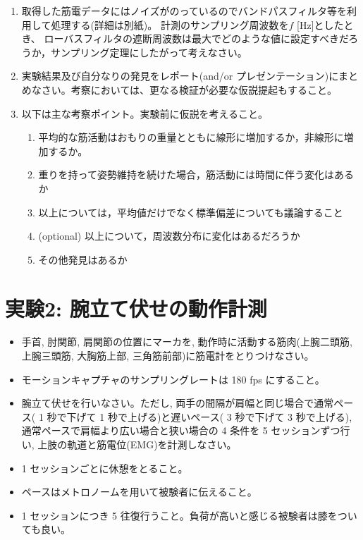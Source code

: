 \documentclass{jsarticle}
\begin{document}
\begin{enumerate}
  \item 取得した筋電データにはノイズがのっているのでバンドパスフィルタ等を利用して処理する(詳細は別紙)。
  計測のサンプリング周波数を$f$ [Hz]としたとき、
  ローバスフィルタの遮断周波数は最大でどのような値に設定すべきだろうか，サンプリング定理にしたがって考えなさい。
  \item 実験結果及び自分なりの発見をレポート(and/or プレゼンテーション)にまとめなさい。考察においては、更なる検証が必要な仮説提起もすること。
  \item 以下は主な考察ポイント。実験前に仮説を考えること。
  \begin{enumerate}
    \item 平均的な筋活動はおもりの重量とともに線形に増加するか，非線形に増加するか。
    \item 重りを持って姿勢維持を続けた場合，筋活動には時間に伴う変化はあるか
    \item 以上については，平均値だけでなく標準偏差についても議論すること
    \item (optional) 以上について，周波数分布に変化はあるだろうか
    \item その他発見はあるか
  \end{enumerate}
  
\end{enumerate}


\section{実験2: 腕立て伏せの動作計測}


\begin{itemize}
\item 手首, 肘関節, 肩関節の位置にマーカを, 動作時に活動する筋肉(上腕二頭筋, 上腕三頭筋, 大胸筋上部, 三角筋前部)に筋電計をとりつけなさい。
\item モーションキャプチャのサンプリングレートは 180 fps にすること。
\item 腕立て伏せを行いなさい。ただし, 両手の間隔が肩幅と同じ場合で通常ペース( 1 秒で下げて 1 秒で上げる)と遅いペース( 3 秒で下げて 3 秒で上げる), 通常ペースで肩幅より広い場合と狭い場合の 4 条件を 5 セッションずつ行い, 上肢の軌道と筋電位(EMG)を計測しなさい。
\item 1 セッションごとに休憩をとること。
\item ペースはメトロノームを用いて被験者に伝えること。
\item 1 セッションにつき 5 往復行うこと。負荷が高いと感じる被験者は膝をついても良い。
\end{itemize}
\end{document}
